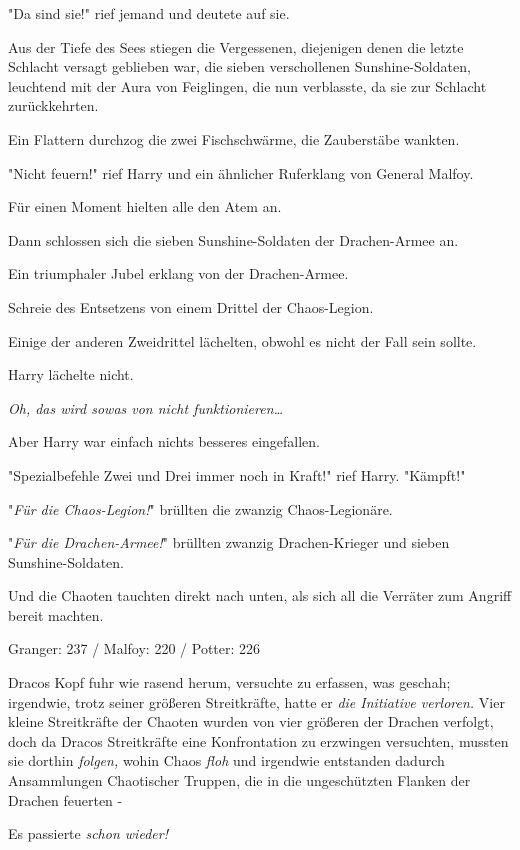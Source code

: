 {"Da sind sie!" rief jemand und deutete auf sie.

Aus der Tiefe des Sees stiegen die Vergessenen, diejenigen denen die letzte Schlacht versagt geblieben war, die sieben verschollenen Sunshine-Soldaten, leuchtend mit der Aura von Feiglingen, die nun verblasste, da sie zur Schlacht zurückkehrten.

Ein Flattern durchzog die zwei Fischschwärme, die Zauberstäbe wankten.

"Nicht feuern!" rief Harry und ein ähnlicher Ruferklang von General Malfoy.

Für einen Moment hielten alle den Atem an.

Dann schlossen sich die sieben Sunshine-Soldaten der Drachen-Armee an.

Ein triumphaler Jubel erklang von der Drachen-Armee.

Schreie des Entsetzens von einem Drittel der Chaos-Legion.

Einige der anderen Zweidrittel lächelten, obwohl es nicht der Fall sein sollte.

Harry lächelte nicht.

\emph{Oh, das wird sowas von nicht funktionieren…}

Aber Harry war einfach nichts besseres eingefallen.

"Spezialbefehle Zwei und Drei immer noch in Kraft!" rief Harry. "Kämpft!"

"\emph{Für die Chaos-Legion!}" brüllten die zwanzig Chaos-Legionäre.

"\emph{Für die Drachen-Armee!}" brüllten zwanzig Drachen-Krieger und sieben Sunshine-Soldaten.

Und die Chaoten tauchten direkt nach unten, als sich all die Verräter zum Angriff bereit machten.

\later

Granger: 237 / Malfoy: 220 / Potter: 226

Dracos Kopf fuhr wie rasend herum, versuchte zu erfassen, was geschah; irgendwie, trotz seiner größeren Streitkräfte, hatte er \emph{die Initiative verloren.} Vier kleine Streitkräfte der Chaoten wurden von vier größeren der Drachen verfolgt, doch da Dracos Streitkräfte eine Konfrontation zu erzwingen versuchten, mussten sie dorthin \emph{folgen,} wohin Chaos \emph{floh} und irgendwie entstanden dadurch Ansammlungen Chaotischer Truppen, die in die ungeschützten Flanken der Drachen feuerten -

Es passierte \emph{schon wieder!}

}
